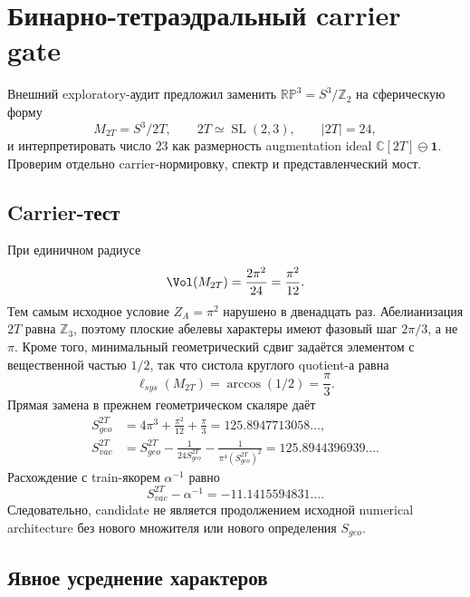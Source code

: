 \chapter{Бинарно-тетраэдральный carrier gate}

Внешний exploratory-аудит предложил заменить
\(\mathbb{RP}^3=S^3/\mathbb Z_2\) на сферическую форму
\begin{equation}
 M_{2T}=S^3/2T,
 \qquad
 2T\simeq\operatorname{SL}(2,3),
 \qquad |2T|=24,
\end{equation}
и интерпретировать число \(23\) как размерность augmentation ideal
\(\mathbb C[2T]\ominus\mathbf1\). Проверим отдельно carrier-нормировку,
спектр и представленческий мост.

\section{Carrier-тест}

При единичном радиусе
\begin{equation}
 \Vol(M_{2T})=\frac{2\pi^2}{24}=\frac{\pi^2}{12}.
\end{equation}
Тем самым исходное условие \(Z_A=\pi^2\) нарушено в двенадцать раз.
Абелианизация \(2T\) равна \(\mathbb Z_3\), поэтому плоские абелевы
характеры имеют фазовый шаг \(2\pi/3\), а не \(\pi\). Кроме того, минимальный
геометрический сдвиг задаётся элементом с вещественной частью \(1/2\), так
что систола круглого quotient-а равна
\begin{equation}
 \ell_{sys}(M_{2T})=\arccos(1/2)=\frac{\pi}{3}.
\end{equation}
Прямая замена в прежнем геометрическом скаляре даёт
\begin{align}
 S_{geo}^{2T}
 &=4\pi^3+\frac{\pi^2}{12}+\frac{\pi}{3}
 =125.8947713058\ldots,\\
 S_{vac}^{2T}
 &=S_{geo}^{2T}-\frac{1}{24S_{geo}^{2T}}
 -\frac{1}{\pi^4(S_{geo}^{2T})^2}
 =125.8944396939\ldots.
\end{align}
Расхождение с train-якорем \(\alpha^{-1}\) равно
\begin{equation}
 S_{vac}^{2T}-\alpha^{-1}=-11.1415594831\ldots.
\end{equation}
Следовательно, candidate не является продолжением исходной numerical
architecture без нового множителя или нового определения \(S_{geo}\).

\section{Явное усреднение характеров}

